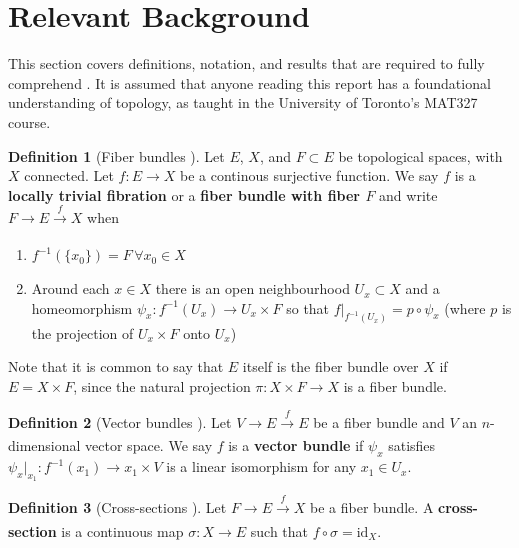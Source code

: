 \documentclass[12pt]{article}
\theoremstyle{definition}
\newtheorem{defn}{Definition}
\begin{document}
\section{Relevant Background}
This section covers definitions, notation, and results that are required to
fully comprehend \cite{topology-robot-arm}. It is assumed that anyone reading
this report has a foundational understanding of topology, as taught 
in the University of Toronto's MAT327 course.

\begin{defn}[Fiber bundles \cite{topology-fiber-bundles}]
    Let \(E\), \(X\), and \(F \subset E\) be topological spaces, 
    with \(X\) connected.
    Let \(f : E \rightarrow X\) be a continous surjective function. 
    We say \(f\) is a \textbf{locally trivial fibration} or a 
    \textbf{fiber bundle with fiber \(F\)} and write 
    \(F \rightarrow E \xrightarrow[]{f} X\) when
    \begin{enumerate}
        \item \(f^{-1}(\{x_0\}) = F \, \forall x_0 \in X\)
        \item Around each \(x \in X\) there is an open neighbourhood 
            \(U_x \subset X\) and a homeomorphism
            \(\psi_x : f^{-1}(U_x) \rightarrow U_x \times F\) so that
            \(f\vert_{f^{-1}(U_x)} = p \circ \psi_x\) (where \(p\)
            is the projection of \(U_x \times F\) onto \(U_x\))
    \end{enumerate}
    Note that it is common to say that \(E\) itself is the fiber bundle over
    \(X\) if \(E = X \times F\), since the natural projection 
    \(\pi : X \times F \rightarrow X\) is a fiber bundle.
\end{defn}

\begin{defn}[Vector bundles \cite{topology-fiber-bundles}]
    Let \(V \rightarrow E \xrightarrow[]{f} E\) be a fiber bundle and \(V\) an
    \(n\)-dimensional vector space. We say \(f\) is a
    \textbf{vector bundle} if \(\psi_x\) satisfies
    \(\psi_x \vert_{x_1} : f^{-1}(x_1) \rightarrow {x_1}\times V\) is a linear
    isomorphism for any \(x_1 \in U_x\).
\end{defn}

\begin{defn}[Cross-sections \cite{topology-fiber-bundles}]
    Let \(F \rightarrow E \xrightarrow[]{f} X\) be a fiber bundle.
    A \textbf{cross-section} is a continuous map \(\sigma : X \rightarrow E\)
    such that \(f \circ \sigma = \text{id}_X\).
\end{defn}
\end{document}
